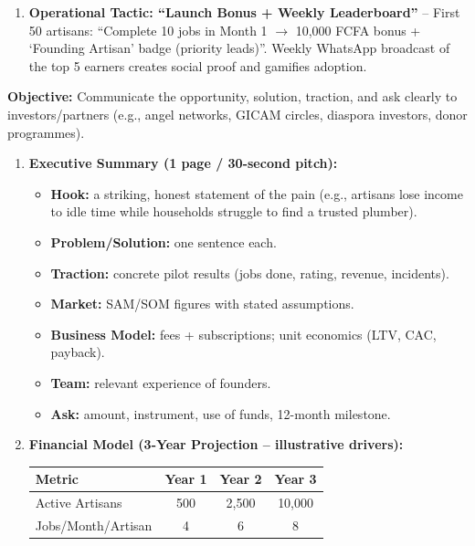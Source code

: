 \documentclass[11pt]{article}
\begin{document}
\begin{exoresolu}
\begin{enumerate}
\begin{enumerate}
        \item \textbf{Operational Tactic: ``Launch Bonus + Weekly Leaderboard''} -- First 50 artisans: ``Complete 10 jobs in Month 1 $\to$ 10,000 FCFA bonus + `Founding Artisan' badge (priority leads)''. Weekly WhatsApp broadcast of the top 5 earners creates social proof and gamifies adoption.
    \end{enumerate}
\end{enumerate}
\end{exoresolu}

\begin{methode}
\textbf{Objective:} Communicate the opportunity, solution, traction, and ask clearly to investors/partners (e.g., angel networks, GICAM circles, diaspora investors, donor programmes).
\begin{enumerate}
    \item \textbf{Executive Summary (1 page / 30-second pitch):}
    \begin{itemize}
        \item \textbf{Hook:} a striking, honest statement of the pain (e.g., artisans lose income to idle time while households struggle to find a trusted plumber).
        \item \textbf{Problem/Solution:} one sentence each.
        \item \textbf{Traction:} concrete pilot results (jobs done, rating, revenue, incidents).
        \item \textbf{Market:} SAM/SOM figures with stated assumptions.
        \item \textbf{Business Model:} fees + subscriptions; unit economics (LTV, CAC, payback).
        \item \textbf{Team:} relevant experience of founders.
        \item \textbf{Ask:} amount, instrument, use of funds, 12-month milestone.
    \end{itemize}
    \item \textbf{Financial Model (3-Year Projection -- illustrative drivers):}
    \begin{center}
    \begin{tabularx}{\linewidth}{|X|c|c|c|}\hline
    \rowcolor{popblueL} \textbf{Metric} & \textbf{Year 1} & \textbf{Year 2} & \textbf{Year 3} \\ \hline
    Active Artisans & 500 & 2,500 & 10,000 \\ \hline
    Jobs/Month/Artisan & 4 & 6 & 8 \\ \hline

\end{tabularx}
\end{center}
\end{enumerate}
\end{methode}
\end{document}
